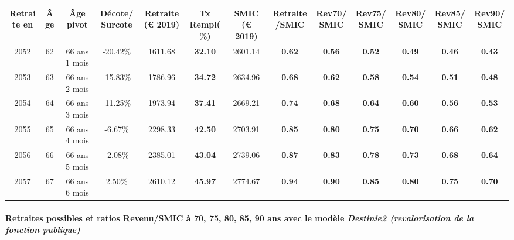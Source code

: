 { \scriptsize \begin{center} 
\begin{tabular}[htb]{|c|c||c|c||c|c||c||c|c|c|c|c|c|} 
\hline 
 Retraite en &  Âge &  Âge pivot &  Décote/Surcote &  Retraite (\euro{} 2019) &  Tx Rempl(\%) &  SMIC (\euro{} 2019) &  Retraite/SMIC &  Rev70/SMIC &  Rev75/SMIC &  Rev80/SMIC &  Rev85/SMIC &  Rev90/SMIC \\ 
\hline \hline 
 2052 &  62 &  66 ans 1 mois &  -20.42\% &  1611.68 &  {\bf 32.10} &  2601.14 &  {\bf {\color{red} 0.62}} &  {\bf {\color{red} 0.56}} &  {\bf {\color{red} 0.52}} &  {\bf {\color{red} 0.49}} &  {\bf {\color{red} 0.46}} &  {\bf {\color{red} 0.43}} \\ 
\hline 
 2053 &  63 &  66 ans 2 mois &  -15.83\% &  1786.96 &  {\bf 34.72} &  2634.96 &  {\bf {\color{red} 0.68}} &  {\bf {\color{red} 0.62}} &  {\bf {\color{red} 0.58}} &  {\bf {\color{red} 0.54}} &  {\bf {\color{red} 0.51}} &  {\bf {\color{red} 0.48}} \\ 
\hline 
 2054 &  64 &  66 ans 3 mois &  -11.25\% &  1973.94 &  {\bf 37.41} &  2669.21 &  {\bf {\color{red} 0.74}} &  {\bf {\color{red} 0.68}} &  {\bf {\color{red} 0.64}} &  {\bf {\color{red} 0.60}} &  {\bf {\color{red} 0.56}} &  {\bf {\color{red} 0.53}} \\ 
\hline 
 2055 &  65 &  66 ans 4 mois &  -6.67\% &  2298.33 &  {\bf 42.50} &  2703.91 &  {\bf {\color{red} 0.85}} &  {\bf {\color{red} 0.80}} &  {\bf {\color{red} 0.75}} &  {\bf {\color{red} 0.70}} &  {\bf {\color{red} 0.66}} &  {\bf {\color{red} 0.62}} \\ 
\hline 
 2056 &  66 &  66 ans 5 mois &  -2.08\% &  2385.01 &  {\bf 43.04} &  2739.06 &  {\bf {\color{red} 0.87}} &  {\bf {\color{red} 0.83}} &  {\bf {\color{red} 0.78}} &  {\bf {\color{red} 0.73}} &  {\bf {\color{red} 0.68}} &  {\bf {\color{red} 0.64}} \\ 
\hline 
 2057 &  67 &  66 ans 6 mois &  2.50\% &  2610.12 &  {\bf 45.97} &  2774.67 &  {\bf {\color{red} 0.94}} &  {\bf {\color{red} 0.90}} &  {\bf {\color{red} 0.85}} &  {\bf {\color{red} 0.80}} &  {\bf {\color{red} 0.75}} &  {\bf {\color{red} 0.70}} \\ 
\hline 
\hline 
\end{tabular} 
\end{center} } 
\paragraph{Retraites possibles et ratios Revenu/SMIC à 70, 75, 80, 85, 90 ans avec le modèle \emph{Destinie2 (revalorisation de la fonction publique)}}  
 

